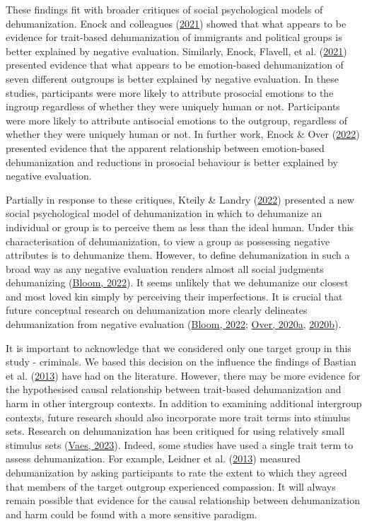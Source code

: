 \documentclass[
]{article}
\begin{document}
These findings fit with broader critiques of social psychological models of dehumanization. Enock and colleagues (\protect\hyperlink{ref-Enock2021a}{2021}) showed that what appears to be evidence for trait-based dehumanization of immigrants and political groups is better explained by negative evaluation. Similarly, Enock, Flavell, et al. (\protect\hyperlink{ref-Enock2021b}{2021}) presented evidence that what appears to be emotion-based dehumanization of seven different outgroups is better explained by negative evaluation. In these studies, participants were more likely to attribute prosocial emotions to the ingroup regardless of whether they were uniquely human or not. Participants were more likely to attribute antisocial emotions to the outgroup, regardless of whether they were uniquely human or not. In further work, Enock \& Over (\protect\hyperlink{ref-Enock2022}{2022}) presented evidence that the apparent relationship between emotion-based dehumanization and reductions in prosocial behaviour is better explained by negative evaluation.

Partially in response to these critiques, Kteily \& Landry (\protect\hyperlink{ref-Kteily2022}{2022}) presented a new social psychological model of dehumanization in which to dehumanize an individual or group is to perceive them as less than the ideal human. Under this characterisation of dehumanization, to view a group as possessing negative attributes is to dehumanize them. However, to define dehumanization in such a broad way as any negative evaluation renders almost all social judgments dehumanizing (\protect\hyperlink{ref-Bloom2022}{Bloom, 2022}). It seems unlikely that we dehumanize our closest and most loved kin simply by perceiving their imperfections. It is crucial that future conceptual research on dehumanization more clearly delineates dehumanization from negative evaluation (\protect\hyperlink{ref-Bloom2022}{Bloom, 2022}; \protect\hyperlink{ref-Over2020a}{Over, 2020a}, \protect\hyperlink{ref-Over2020b}{2020b}).

It is important to acknowledge that we considered only one target group in this study - criminals. We based this decision on the influence the findings of Bastian et al. (\protect\hyperlink{ref-Bastian2013}{2013}) have had on the literature. However, there may be more evidence for the hypothesised causal relationship between trait-based dehumanization and harm in other intergroup contexts. In addition to examining additional intergroup contexts, future research should also incorporate more trait terms into stimulus sets. Research on dehumanization has been critiqued for using relatively small stimulus sets (\protect\hyperlink{ref-Vaes2023}{Vaes, 2023}). Indeed, some studies have used a single trait term to assess dehumanization. For example, Leidner et al. (\protect\hyperlink{ref-Leidner2013}{2013}) measured dehumanization by asking participants to rate the extent to which they agreed that members of the target outgroup experienced compassion. It will always remain possible that evidence for the causal relationship between dehumanization and harm could be found with a more sensitive paradigm.
\end{document}
